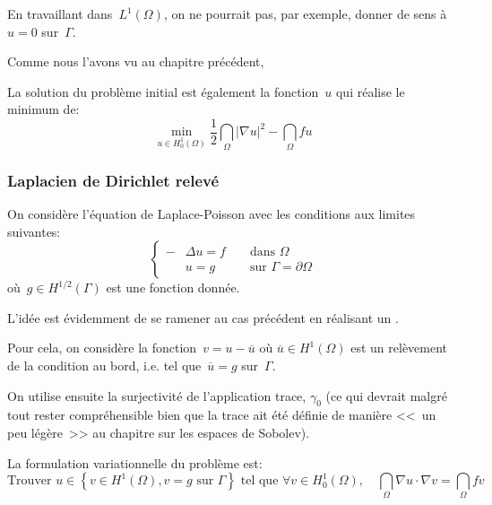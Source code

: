 En travaillant dans~$L^1(\Omega)$, on ne pourrait pas, par exemple, donner de sens
à~$u = 0$ sur~$\Gamma$.

\medskip
Comme nous l'avons vu au chapitre précédent, 

La solution du problème initial est également la fonction~$u$ qui réalise
le minimum de:
\begin{equation}
\min_{u\in H^1_0(\Omega)} \dfrac12\dint_\Omega |\nabla u|^2-\dint_\Omega fu
\end{equation}

\medskip
\subsubsection{Laplacien de Dirichlet relevé}
On considère l'équation de Laplace-Poisson avec les conditions aux limites suivantes:
\begin{equation}\left\{\begin{aligned}
-&\Delta u=f &&\text{ dans } \Omega\\
&u=g &&\text{ sur } \Gamma=\partial\Omega
\end{aligned}
\right.
\end{equation}
où~$g\in H^{1/2}(\Gamma)$ est une fonction donnée.

\medskip
L'idée est évidemment de se ramener au cas précédent en réalisant un
.

Pour cela, on considère la fonction~$v = u - \overline{u}$ où
$\overline{u}\in H^1(\Omega)$ est un relèvement de la condition
au bord, i.e. tel que~$\overline{u}=g$ sur~$\Gamma$.

On utilise ensuite la surjectivité de l'application trace, $\gamma_0$ (ce qui
devrait malgré tout rester compréhensible bien que la trace ait été définie
de manière <<~un peu légère~>> au chapitre sur les espaces de
Sobolev).

\medskip
La formulation variationnelle du problème est:
\begin{equation}
\text{Trouver } u \in \left\{ v\in H^1(\Omega), v=g \text{ sur } \Gamma\right\}
 \text{ tel que }
\forall v\in H^1_0(\Omega),
\quad\dint_\Omega \nabla u\cdot\nabla v = \dint_\Omega fv
\end{equation}

